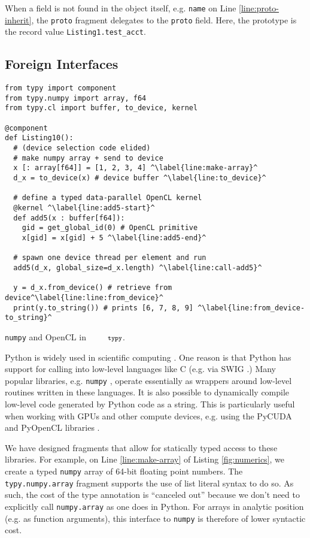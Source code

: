 \documentclass[10pt]{sigplanconf}
\newcommand{\typy}{\texttt{\footnotesize typy}}
\newcommand{\lip}[1]{\lstinline[language=Python,basicstyle=\ttfamily\footnotesize,morekeywords={with},deletendkeywords={tuple,buffer,map}]{#1}}
\newcommand{\li}[1]{\lip{#1}}
\begin{document}
When a field is not found in the object itself, e.g. \li{name} on Line \ref{line:proto-inherit}, the \li{proto} fragment delegates to the \li{proto} field. Here, the prototype is the record value \li{Listing1.test_acct}. 

\subsection{Foreign Interfaces}\label{sec:ffis}


\begin{codelisting}[t]
\vspace{-3px}
\begin{lstlisting}
from typy import component
from typy.numpy import array, f64
from typy.cl import buffer, to_device, kernel

@component
def Listing10():
  # (device selection code elided)
  # make numpy array + send to device
  x [: array[f64]] = [1, 2, 3, 4] ^\label{line:make-array}^
  d_x = to_device(x) # device buffer ^\label{line:to_device}^

  # define a typed data-parallel OpenCL kernel
  @kernel ^\label{line:add5-start}^
  def add5(x : buffer[f64]):
    gid = get_global_id(0) # OpenCL primitive
    x[gid] = x[gid] + 5 ^\label{line:add5-end}^

  # spawn one device thread per element and run
  add5(d_x, global_size=d_x.length) ^\label{line:call-add5}^

  y = d_x.from_device() # retrieve from device^\label{line:line:from_device}^
  print(y.to_string()) # prints [6, 7, 8, 9] ^\label{line:from_device-to_string}^
\end{lstlisting}
\caption{\li{numpy} and OpenCL in $\typy$.}
\label{fig:numerics}
\end{codelisting}

Python is widely used in scientific computing \cite{oliphant2007python}. One reason is that Python has support for calling into low-level languages like C (e.g. via SWIG \cite{beazley2003automated}.) Many popular libraries, e.g. \li{numpy} \cite{van2011numpy}, operate essentially as wrappers around low-level routines written in these languages. It is also possible to dynamically compile low-level code generated by Python code as a string. This is particularly useful when working with GPUs and other compute devices, e.g. using the PyCUDA and PyOpenCL libraries \cite{klockner2011pycuda}.

We have designed fragments that allow for statically typed access to these libraries. For example, on Line \ref{line:make-array} of Listing \ref{fig:numerics}, we create a typed \li{numpy} array of 64-bit floating point numbers. The \li{typy.numpy.array} fragment supports the use of list literal syntax to do so. As such, the cost of the type annotation is ``canceled out'' because we don't need to explicitly call \li{numpy.array} as one does in Python. For arrays in analytic position (e.g. as function arguments), this interface to \li{numpy} is therefore of lower syntactic cost.
\end{document}
